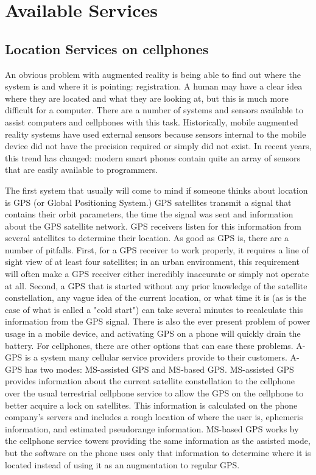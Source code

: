 \documentclass{acm_proc_article-sp}
\begin{document}
\section{Available Services}
\subsection{Location Services on cellphones}

An obvious problem with augmented reality is being able to find out where the system is and where it is pointing: registration.  A human may have a clear idea where they are located and what they are looking at, but this is much more difficult for a computer. \cite{szeliski2010computer}  There are a number of systems and sensors available to assist computers and cellphones with this task.  
Historically, mobile augmented reality systems have used external sensors because sensors internal to the mobile device did not have the precision required or simply did not exist.  In recent years, this trend has changed:  modern smart phones contain quite an array of sensors that are easily available to programmers.  

The first system that usually will come to mind if someone thinks about location is GPS (or Global Positioning System.)  GPS satellites transmit a signal that contains their orbit parameters, the time the signal was sent and information about the GPS satellite network.  GPS receivers listen for this information from several satellites to determine their location. \cite{hofmann1997global}  As good as GPS is, there are a number of pitfalls.  First, for a GPS receiver to work properly, it requires a line of sight view of at least four satellites; in an urban environment, this requirement will often make a GPS receiver either incredibly inaccurate or simply not operate at all.  Second, a GPS that is started without any prior knowledge of the satellite constellation, any vague idea of the current location, or what time it is (as is the case of what is called a "cold start") can take several minutes to recalculate this information from the GPS signal.  There is also the ever present problem of power usage in a mobile device, and activating GPS on a phone will quickly drain the battery.  \cite{djuknic2002geolocation}  For cellphones, there are other options that can ease these problems.  A-GPS is a system many cellular service providers provide to their customers.  A-GPS has two modes: MS-assisted GPS and MS-based GPS. MS-assisted GPS provides information about the current  satellite constellation to the cellphone over the usual terrestrial cellphone service to allow the GPS on the cellphone to better acquire a lock on satellites.  This information is calculated on the phone company's servers and includes a rough location of where the user is, ephemeris information, and estimated pseudorange information. MS-based GPS works by the cellphone service towers providing the same information as the assisted mode, but the software on the phone uses only that information to determine where it is located instead of using it as an augmentation to regular GPS. \cite{sun2005signal}
\end{document}
